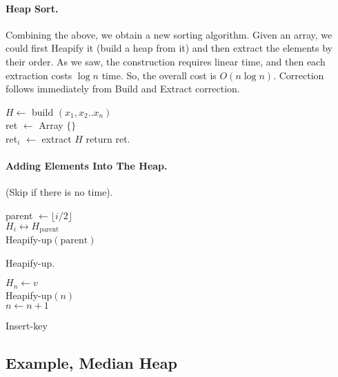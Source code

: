 \newpage

\paragraph{Heap Sort.}   
Combining the above, we obtain a new sorting algorithm. Given an array, we could first Heapify it (build a heap from it) and then extract the elements by their order. As we saw, the construction requires linear time, and then each extraction costs $\log n$ time. So, the overall cost is $O\left( n\log n  \right)$. Correction follows immediately from Build and Extract correction.  
\begin{algorithm}
  $H \leftarrow $ build $ \left( x_1, x_2 .. x_{n}  \right) $ \\ 
  ret $ \leftarrow $ Array $ \{ \} $ \\
   {
  ret$_{i}$ $\leftarrow$ extract $H$
  }
  return ret. 
\end{algorithm}

\paragraph{Adding Elements Into The Heap.} (Skip if there is no time).

\begin{algorithm}
parent $\leftarrow \lfloor i/2 \rfloor $ \\
 { 
  $ H_{i} \leftrightarrow H_{\text{parent}} $ \\ 
  Heapify-up$\left( \text{parent}  \right)$
}
\caption{Heapify-up.}
\end{algorithm}


\begin{algorithm}
$ H_{n} \leftarrow v $ \\ 
Heapify-up$\left( n \right)$\\
$ n \leftarrow n + 1 $ 
\caption{Insert-key}
\end{algorithm}



\newpage 
\subsection{Example, Median Heap}

